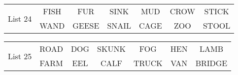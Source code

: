 \documentclass{article}
\begin{document}
\vspace{.1in}
\hspace{.5in}\begin{tabular}{r||c c c c c c }
\multirow{2}{*}{List 24} & FISH & FUR & SINK & MUD & CROW & STICK\\
\cline{2-7}			& WAND & GEESE & SNAIL & CAGE & ZOO & STOOL\\
\end{tabular}

\vspace{.1in}
\hspace{.5in}\begin{tabular}{r||c c c c c c }
\multirow{2}{*}{List 25} & ROAD & DOG & SKUNK & FOG & HEN & LAMB\\
\cline{2-7}			& FARM & EEL & CALF & TRUCK & VAN & BRIDGE\\
\end{tabular}
\end{document}
